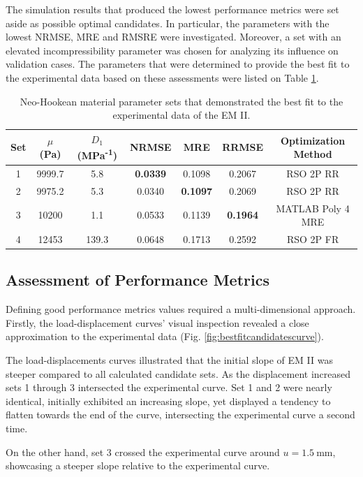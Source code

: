 The simulation results that produced the lowest performance metrics were set aside as possible
optimal candidates. In particular, the parameters with the lowest NRMSE, MRE and RMSRE were  
investigated. Moreover, a set with an elevated incompressibility parameter was chosen for 
analyzing its influence on validation cases.
The parameters that were determined to provide the best fit to the 
experimental data based on these assessments were listed on Table \ref{tab:materialsetbestfit}.
\begin{table}[ht!]
    \centering
    \begin{tabular}{|c|c|c|c|c|c|c|}
    \hline
    Set & $\mu$ (Pa) & $D_1$ (MPa\textsuperscript{-1}) & NRMSE & MRE & RRMSE & Optimization Method\\
    \hline
    1 & 9999.7 & 5.8 & \textbf{0.0339} & 0.1098 & 0.2067 & RSO 2P RR\\
    2 & 9975.2 & 5.3 & 0.0340 & \textbf{0.1097} & 0.2069 & RSO 2P RR\\
    3 & 10200 & 1.1 & 0.0533 & 0.1139 & \textbf{0.1964} & MATLAB Poly 4 MRE\\
    4 & 12453 & 139.3 & 0.0648 & 0.1713 & 0.2592 & RSO 2P FR\\
    \hline
    \end{tabular}
    \caption[Best material parameter sets]{Neo-Hookean material parameter sets that demonstrated the best fit to the experimental data of the EM II.}
	\label{tab:materialsetbestfit}
\end{table}

\subsection*{Assessment of Performance Metrics}
Defining good performance metrics values required a multi-dimensional approach. 
Firstly, the load-displacement curves' visual inspection revealed a close approximation 
to the experimental data (Fig. \ref{fig:bestfitcandidatescurve}).

The load-displacements curves illustrated that the initial slope of EM II was steeper compared to 
all calculated candidate sets. As the displacement increased sets \SI{1}{} through \SI{3}{} intersected 
the experimental curve. Set \SI{1}{} and \SI{2}{} were nearly identical, initially exhibited an increasing 
slope, yet displayed a tendency to flatten towards the end of the curve, intersecting the experimental curve 
a second time.

On the other hand, set \SI{3}{} crossed the experimental curve around $u=\SI{1.5}{\milli \meter}$, showcasing 
a steeper slope relative to the experimental curve. 


